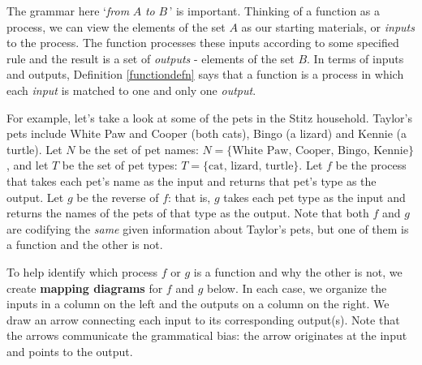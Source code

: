 \medskip

The grammar here `\textit{from} $A$ \textit{to} $B\,$'  is important.  Thinking of a function as a process, we can view the elements of the set $A$ as our starting materials, or \textit{inputs} to the process.  The function  processes these inputs according to some specified rule and the result is a set of  \textit{outputs}  - elements of the set $B$. In terms of inputs and outputs, Definition \ref{functiondefn}  says that a function is a process in which each \textit{input} is matched to one and only one \textit{output}.

\medskip

For example, let's take a look at some of the pets in the Stitz household.  Taylor's pets include White Paw and Cooper (both cats), Bingo (a lizard) and Kennie (a turtle).  Let $N$ be the set of pet names: $N = \{ \text{White Paw, Cooper, Bingo, Kennie} \}$, and let $T$ be the set of pet types:  $T = \{ \text{cat, lizard, turtle} \}$.   Let $f$ be the process that takes each pet's name as the input and returns that pet's type as the output. Let $g$ be the reverse of $f$:  that is, $g$ takes each pet type as the input and returns the names of the pets of that type as the output.   Note that both $f$ and $g$ are codifying the \textit{same} given information about Taylor's pets,  but one of them is a function and the other is not.  

\medskip

To help identify which process $f$ or $g$ is a function and  why the other is not, we create   \textbf{mapping diagrams} for $f$ and $g$ below.  In each case, we organize the inputs in a column on the left and the outputs on a column on the right.  We draw an arrow connecting each input to its corresponding output(s).  Note that the arrows communicate the grammatical bias: the arrow originates at the input and points to the output.

\medskip

